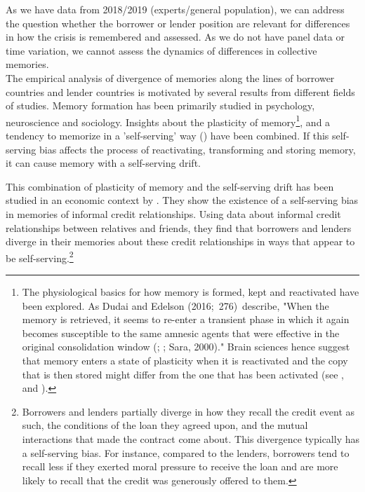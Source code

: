 As we have data from 2018/2019 (experts/general population), we can address
the question whether the borrower or lender position are relevant for
differences in how the crisis is remembered and assessed. As we do not have
panel data or time variation, we cannot assess the dynamics of
differences in collective memories.
\\

The empirical analysis of divergence of memories along the lines of borrower
countries and lender countries is motivated by several results from different fields of studies. 
Memory formation has been primarily studied in psychology, neuroscience and sociology.
Insights about the plasticity of memory\footnote{%
The physiological basics for how memory is formed, kept and reactivated have
been explored. As Dudai and Edelson (2016;\ 276)\ describe, "When the memory
is retrieved, it seems to re-enter a transient phase in which it again
becomes susceptible to the same amnesic agents that were effective in the
original consolidation window (\cite{dudai}; \cite{nader}; Sara,
2000)." Brain sciences hence suggest that memory enters a state of
plasticity when it is reactivated and the copy that is then stored might
differ from the one that has been activated (see \cite{agren}, and \cite{lee}).}, and a tendency to memorize in a 'self-serving' way
(\cite{bell}) have been combined. If this self-serving bias
affects the process of reactivating, transforming and storing memory, it can
cause memory with a self-serving drift.

This combination of plasticity of memory and the self-serving drift has been
studied in an economic context by \cite{dezso}. They show the existence of a self-serving bias in
memories of informal credit relationships. Using data about informal credit
relationships between relatives and friends, they find that borrowers and
lenders diverge in their memories about these credit relationships in
 ways that appear to be self-serving.\footnote{%
Borrowers and lenders partially diverge in how they recall the credit event
as such, the conditions of the loan they agreed upon, and the mutual
interactions that made the contract come about. This divergence typically
has a self-serving bias. For instance, compared to the lenders, borrowers
tend to recall less if they exerted moral pressure to receive the loan and
are more likely to recall that the credit was generously offered to them.}

